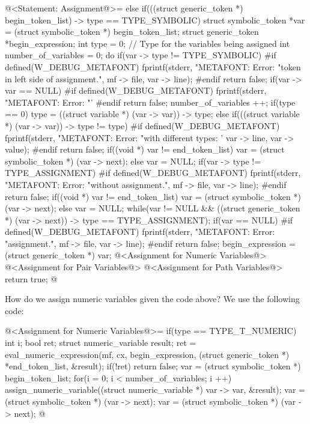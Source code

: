 \iniciocodigo
@<Statement: Assignment@>=
else if(((struct generic_token *) begin_token_list) -> type ==
        TYPE_SYMBOLIC){
  struct symbolic_token *var = (struct symbolic_token *) begin_token_list;
  struct generic_token *begin_expression;
  int type = 0; // Type for the variables being assigned
  int number_of_variables = 0;
  do{
    if(var -> type != TYPE_SYMBOLIC){
#if defined(W_DEBUG_METAFONT)
      fprintf(stderr, "METAFONT: Error: %
              "token in left side of assignment.\n", mf -> file,
              var -> line);
#endif
      return false;
    }
    if(var -> var == NULL){
#if defined(W_DEBUG_METAFONT)
      fprintf(stderr, "METAFONT: Error: %
              "'%
#endif
      return false;
    }
    number_of_variables ++;
    if(type == 0)
      type = ((struct variable *) (var -> var)) -> type;
    else if(((struct variable *) (var -> var)) -> type != type){
#if defined(W_DEBUG_METAFONT)
      fprintf(stderr, "METAFONT: Error: %
              "with different types: '%
              var -> line, var -> value);
#endif
      return false;
    }
    if((void *) var != end_token_list)
      var = (struct symbolic_token *) (var -> next);
    else
      var = NULL;
    if(var -> type != TYPE_ASSIGNMENT){
#if defined(W_DEBUG_METAFONT)
      fprintf(stderr, "METAFONT: Error: %
              "without assignment.\n", mf -> file, var -> line);
#endif
      return false;
    }
    if((void *) var != end_token_list)
      var = (struct symbolic_token *) (var -> next);
    else
      var = NULL;
  } while(var != NULL &&
          ((struct generic_token *) (var -> next)) -> type ==
          TYPE_ASSIGNMENT);
  if(var == NULL){
#if defined(W_DEBUG_METAFONT)
      fprintf(stderr, "METAFONT: Error: %
              "assignment.\n", mf -> file, var -> line);
#endif
      return false;
  }
  begin_expression = (struct generic_token *) var;
  @<Assignment for Numeric Variables@>
  @<Assignment for Pair Variables@>
  @<Assignment for Path Variables@>
  return true;
}
@
\fimcodigo


How do we assign numeric variables given the code above? We use the
following code:

\iniciocodigo
@<Assignment for Numeric Variables@>=
if(type == TYPE_T_NUMERIC){
  int i;
  bool ret;
  struct numeric_variable result;
  ret = eval_numeric_expression(mf, cx, begin_expression,
                               (struct generic_token *) *end_token_list,
                               &result);
  if(!ret)
    return false;
  var = (struct symbolic_token *) begin_token_list;
  for(i = 0; i < number_of_variables; i ++){
    assign_numeric_variable((struct numeric_variable *) var -> var,
                            &result);
    var = (struct symbolic_token *) (var -> next);
    var = (struct symbolic_token *) (var -> next);
  }
}
@
\fimcodigo

